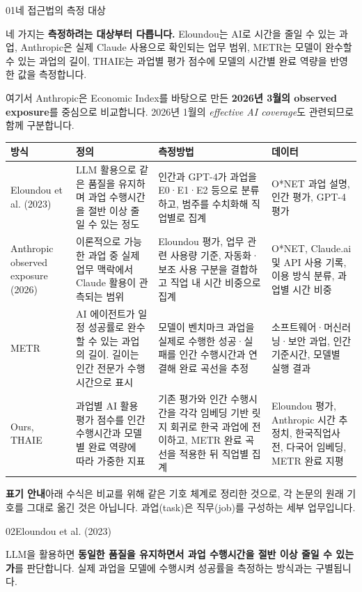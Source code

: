 \documentclass[11pt,a4paper]{article}
\newcommand{\pagetitle}[2]{{\small\sffamily\color{ink}#1\par}\vspace{3mm}{\LARGE\bfseries #2\par}\vspace{4mm}}
\begin{document}
\pagetitle{01\quad 네 접근법의 측정 대상}{정의, 측정방법과 데이터}
네 가지는 \textbf{측정하려는 대상부터 다릅니다.} Eloundou는 AI로 시간을 줄일 수 있는 과업, Anthropic은 실제 Claude 사용으로 확인되는 업무 범위, METR는 모델이 완수할 수 있는 과업의 길이, THAIE는 과업별 평가 점수에 모델의 시간별 완료 역량을 반영한 값을 측정합니다.

여기서 Anthropic은 Economic Index를 바탕으로 만든 \textbf{2026년 3월의 observed exposure}를 중심으로 비교합니다. 2026년 1월의 \textit{effective AI coverage}도 관련되므로 함께 구분합니다.

{\small
\begin{tabularx}{\textwidth}{L{24mm}XXX}
\toprule
방식 & 정의 & 측정방법 & 데이터\\\midrule
Eloundou et al. (2023) & LLM 활용으로 같은 품질을 유지하며 과업 수행시간을 절반 이상 줄일 수 있는 정도 & 인간과 GPT-4가 과업을 E0·E1·E2 등으로 분류하고, 범주를 수치화해 직업별로 집계 & O*NET 과업 설명, 인간 평가, GPT-4 평가\\\addlinespace
Anthropic observed exposure (2026) & 이론적으로 가능한 과업 중 실제 업무 맥락에서 Claude 활용이 관측되는 범위 & Eloundou 평가, 업무 관련 사용량 기준, 자동화·보조 사용 구분을 결합하고 직업 내 시간 비중으로 집계 & O*NET, Claude.ai 및 API 사용 기록, 이용 방식 분류, 과업별 시간 비중\\\addlinespace
METR & AI 에이전트가 일정 성공률로 완수할 수 있는 과업의 길이. 길이는 인간 전문가 수행시간으로 표시 & 모델이 벤치마크 과업을 실제로 수행한 성공·실패를 인간 수행시간과 연결해 완료 곡선을 추정 & 소프트웨어·머신러닝·보안 과업, 인간 기준시간, 모델별 실행 결과\\\addlinespace
Ours, THAIE & 과업별 AI 활용 평가 점수를 인간 수행시간과 모델별 완료 역량에 따라 가중한 지표 & 기존 평가와 인간 수행시간을 각각 임베딩 기반 릿지 회귀로 한국 과업에 전이하고, METR 완료 곡선을 적용한 뒤 직업별 집계 & Eloundou 평가, Anthropic 시간 추정치, 한국직업사전, 다국어 임베딩, METR 완료 지평\\\bottomrule
\end{tabularx}}

\textbf{표기 안내}\enspace 아래 수식은 비교를 위해 같은 기호 체계로 정리한 것으로, 각 논문의 원래 기호를 그대로 옮긴 것은 아닙니다. 과업(task)은 직무(job)를 구성하는 세부 업무입니다.

\newpage
\pagetitle{02\quad Eloundou et al. (2023)}{평가 범주를 점수로 바꾸는 방식}
LLM을 활용하면 \textbf{동일한 품질을 유지하면서 과업 수행시간을 절반 이상 줄일 수 있는가}를 판단합니다. 실제 과업을 모델에 수행시켜 성공률을 측정하는 방식과는 구별됩니다.
\end{document}
